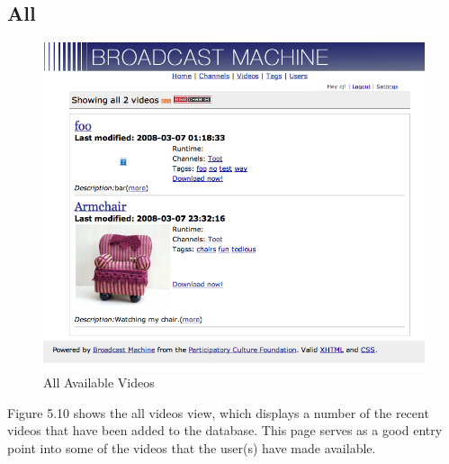 \documentclass[a4paper,12pt]{report}
\begin{document}
\subsection{All}
\begin{figure}[htp]
\begin{center}
\includegraphics[width=150mm]{./images/videoall.png}
\end{center}
\caption{All Available Videos}
\end{figure}

Figure 5.10 shows the all videos view, which displays a number of the recent videos that have been added to the database.
This page serves as a good entry point into some of the videos that the user(s) have made available.
\end{document}
